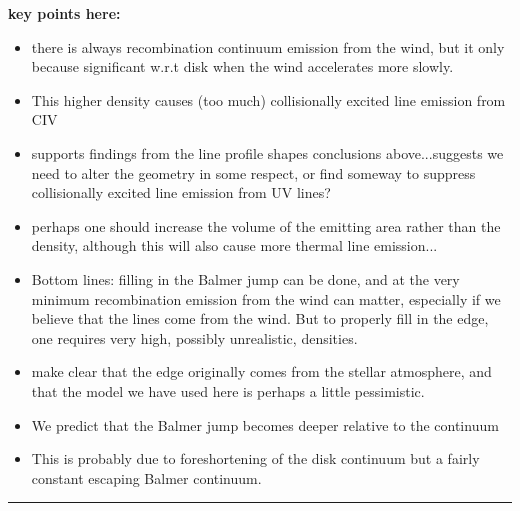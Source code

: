 \documentclass[preprint, a4paper, 11pt]{aastex}
\begin{document}
{\bf
\noindent key points here:

\begin{itemize}
	\item there is always recombination continuum emission from the wind, but it
	only because significant w.r.t disk when the wind accelerates more slowly.
	\item This higher density causes (too much) collisionally excited line emission from CIV
	\item supports findings from the line profile shapes conclusions above...suggests
	we need to alter the geometry in some respect, or find someway to suppress
	collisionally excited line emission from UV lines?
	\item perhaps one should increase the volume of the emitting area rather than the density,
	although this will also cause more thermal line emission...
	\item Bottom lines: filling in the Balmer jump can be done, and at the very minimum recombination
	emission from the wind can matter, especially if we believe that the lines come from the wind. 
	But to properly fill in the edge, one requires very high, possibly unrealistic, densities.
	\item make clear that the edge originally comes from the stellar atmosphere, and that
	the model we have used here is perhaps a little pessimistic.
	\item We predict that the Balmer jump becomes deeper relative to the continuum 
	\item This is probably due to foreshortening of the disk continuum but a fairly constant
	escaping Balmer continuum.
\end{itemize}
}

\noindent\rule{16cm}{0.4pt}
\end{document}
